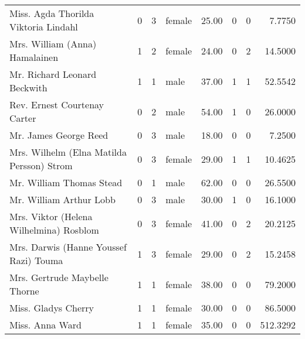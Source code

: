 \begin{tabular}{lrrlrrrr}
Miss. Agda Thorilda Viktoria Lindahl               &         0 &       3 &  female &  25.00 &                        0 &                        0 &    7.7750 \\
Mrs. William (Anna) Hamalainen                     &         1 &       2 &  female &  24.00 &                        0 &                        2 &   14.5000 \\
Mr. Richard Leonard Beckwith                       &         1 &       1 &    male &  37.00 &                        1 &                        1 &   52.5542 \\
Rev. Ernest Courtenay Carter                       &         0 &       2 &    male &  54.00 &                        1 &                        0 &   26.0000 \\
Mr. James George Reed                              &         0 &       3 &    male &  18.00 &                        0 &                        0 &    7.2500 \\
Mrs. Wilhelm (Elna Matilda Persson) Strom          &         0 &       3 &  female &  29.00 &                        1 &                        1 &   10.4625 \\
Mr. William Thomas Stead                           &         0 &       1 &    male &  62.00 &                        0 &                        0 &   26.5500 \\
Mr. William Arthur Lobb                            &         0 &       3 &    male &  30.00 &                        1 &                        0 &   16.1000 \\
Mrs. Viktor (Helena Wilhelmina) Rosblom            &         0 &       3 &  female &  41.00 &                        0 &                        2 &   20.2125 \\
Mrs. Darwis (Hanne Youssef Razi) Touma             &         1 &       3 &  female &  29.00 &                        0 &                        2 &   15.2458 \\
Mrs. Gertrude Maybelle Thorne                      &         1 &       1 &  female &  38.00 &                        0 &                        0 &   79.2000 \\
Miss. Gladys Cherry                                &         1 &       1 &  female &  30.00 &                        0 &                        0 &   86.5000 \\
Miss. Anna Ward                                    &         1 &       1 &  female &  35.00 &                        0 &                        0 &  512.3292 \\

\end{tabular}
